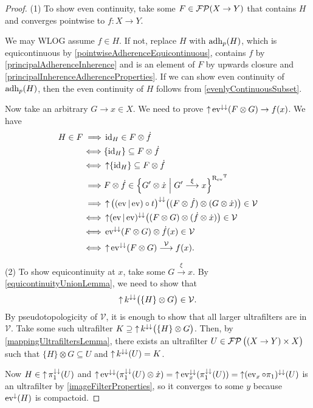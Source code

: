 \begin{proof}
(1) To show even continuity, take some $F\in \operatorname{\mathcal{FP}}(X\to Y)$ that contains $H$ and converges pointwise to $f: X\to Y$. 

We may WLOG assume $f\in H$. If not, replace $H$ with $\operatorname{adh}_p(H)$, which is equicontinuous by \ref{pointwiseAdherenceEquicontinuous}, contains $f$ by \ref{principalAdherenceInherence} and is an element of $F$ by upwards closure and \ref{principalInherenceAdherenceProperties}.
If we can show even continuity of $\operatorname{adh}_p(H)$, then the even continuity of $H$ follows from \ref{evenlyContinuousSubset}.

Now take an arbitrary $G\to x\in X$. We need to prove $\operatorname{\uparrow}\operatorname{ev}^{\downarrow\downarrow}(F\otimes G)\to f(x)$. We have
\begin{align*}
H\in F \implies& \id_H \in F\otimes \pfilter{f} \\
\iff& \{\id_H\} \subseteq F\otimes \pfilter{f} \\
\iff& \upset\{\id_H\} \subseteq F\otimes \pfilter{f} \\
\implies& F\otimes \pfilter{f} \in \setbuilder{G'\otimes \pfilter{x}}{G'\overset{\xi}{\longrightarrow}x}^{\uRelEv^\transp} \\
\implies& \upset \big((\evalMap|\evalMap)\circ t\big)^{\imf\imf}\big((F\otimes \pfilter{f})\otimes (G\otimes \pfilter{x})\big) \in \mathcal{V} \\
\iff& \upset (\evalMap|\evalMap)^{\imf\imf}\big((F\otimes G)\otimes (\pfilter{f}\otimes \pfilter{x})\big) \in \mathcal{V} \\
\iff& \evalMap^{\imf\imf}(F\otimes G)\otimes \pfilter{f}(x) \in \mathcal{V} \\
\iff& \upset\evalMap^{\imf\imf}(F\otimes G) \overset{\mathcal{V}}{\longrightarrow} f(x).
\end{align*}

(2) To show equicontinuity at $x$, take some $G\overset{\xi}{\longrightarrow} x$. By \ref{equicontinuityUnionLemma}, we need to show that
\[ \operatorname{\uparrow} k^{\downarrow\downarrow}\big(\{H\}\otimes G\big) \in \mathcal{V}. \]
By pseudotopologicity of $\mathcal{V}$, it is enough to show that all larger ultrafilters are in $\mathcal{V}$. Take some such ultrafilter $K \supseteq \operatorname{\uparrow} k^{\downarrow\downarrow}\big(\{H\}\otimes G\big)$. Then, by \ref{mappingUltrafiltersLemma}, there exists an ultrafilter $U\in \operatorname{\mathcal{FP}}\big((X\to Y)\times X\big)$ such that $\{H\}\otimes G \subseteq U$ and $\operatorname{\uparrow} k^{\downarrow\downarrow}(U) = K$.

Now $H\in \operatorname{\uparrow}\pi_1^{\downarrow\downarrow}(U)$ and $\operatorname{\uparrow}\operatorname{ev}^{\downarrow\downarrow}(\pi_1^{\downarrow\downarrow}(U)\otimes \dot{x}) = \operatorname{\uparrow}\operatorname{ev}_x^{\downarrow\downarrow}(\pi_1^{\downarrow\downarrow}(U)) = \operatorname{\uparrow}(\operatorname{ev}_x\circ \pi_1)^{\downarrow\downarrow}(U)$ is an ultrafilter by \ref{imageFilterProperties}, so it converges to some $y$ because $\operatorname{ev}^{\downarrow}(H)$ is compactoid.


\end{proof}
